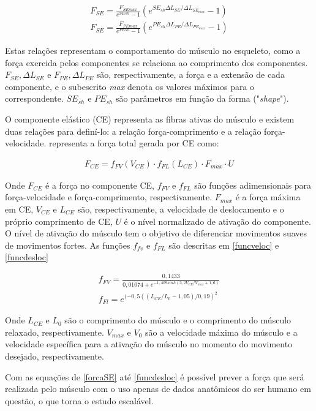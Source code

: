\begin{align}
F_{SE}=\frac{F_{SEmax}}{e^{SEsh}-1}(e^{SE_{sh}\Delta L_{SE}/\Delta L_{SE_{max}}}-1) \label{forcaSE} \\
F_{SE}=\frac{F_{PEmax}}{e^{PEsh}-1}(e^{PE_{sh}\Delta L_{PE}/\Delta L_{PE_{max}}}-1) \label{forcaPE}
\end{align}

Estas relações representam o comportamento do músculo no esqueleto, como a força exercida pelos componentes se relaciona ao comprimento dos componentes. $F_{SE}, \Delta L_{SE}$ e $F_{PE},\Delta L_{PE}$ são, respectivamente, a força e a extensão de cada componente, e o subescrito \textit{max} denota os valores máximos para o correspondente. $SE_{sh}$ e $PE_{sh}$ são parâmetros em função da forma ("\textit{shape}").

O componente elástico (CE) representa as fibras ativas do músculo e existem duas relações para definí-lo: a relação força-comprimento e a relação força-velocidade. \cite{rosen1999performances} representa a força total gerada por CE como:

\begin{align}
F_{CE} = f_{FV}(V_{CE}) \cdot f_{FL}(L_{CE}) \cdot F_{max} \cdot U \label{forcaCE}
\end{align}

Onde $F_{CE}$ é a força no componente CE, $f_{FV}$ e $f_{FL}$ são funções adimensionais para força-velocidade e força-comprimento, respectivamente. $F_{max}$ é a força máxima em CE, $V_{CE}$ e $L_{CE}$ são, respectivamente, a velocidade de deslocamento e o próprio comprimento de CE, $U$ é o nível normalizado de ativação do componente. O nível de ativação do músculo tem o objetivo de diferenciar movimentos suaves de movimentos fortes. As funções $f_{fv}$ e $f_{FL}$ são descritas em \ref{funcveloc} e \ref{funcdesloc}

\begin{align}
f_{FV} = \frac{0,1433}{0,01074+ e^{-1,409sinh(3,2V_{CE}/V_{max}+1,6)}} \label{funcveloc} \\
f_{Fl} = e^{(-0,5((L_{CE}/L_0-1,05)/0,19)^2} \label{funcdesloc}
\end{align}


Onde $L_{CE}$ e $L_0$ são o comprimento do músculo e o comprimento do músculo relaxado, respectivamente. $V_{max}$ e $V_{0}$ são a velocidade máxima do músculo e a velocidade específica para a ativação do músculo no momento do movimento desejado, respectivamente.

Com as equações de \ref{forcaSE} até \ref{funcdesloc} é possível prever a força que será realizada pelo músculo com o uso apenas de dados anatômicos do ser humano em questão, o que torna o estudo escalável.